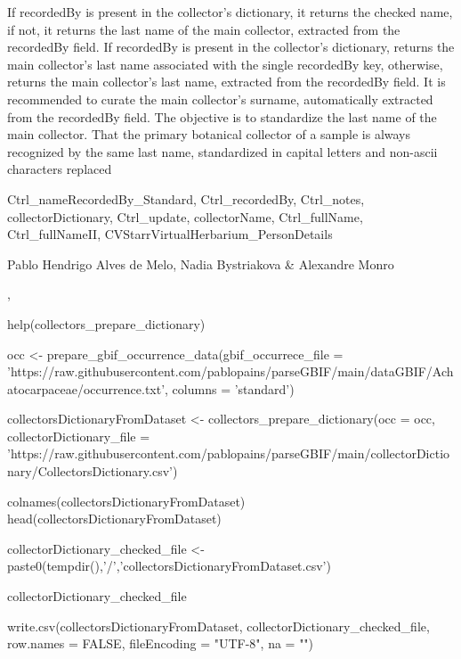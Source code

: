 \documentclass[a4paper]{book}
\begin{document}
%
\begin{Details}
If recordedBy is present in the collector's dictionary, it returns the checked name, if not, it returns the last name of the main collector, extracted from the recordedBy field.
If recordedBy is present in the collector's dictionary, returns the main collector's last name associated with the single recordedBy key,
otherwise, returns the main collector's last name, extracted from the recordedBy field.
It is recommended to curate the main collector's surname, automatically extracted from the recordedBy field.
The objective is to standardize the last name of the main collector.
That the primary botanical collector of a sample is always recognized by the same last name, standardized in capital letters and non-ascii characters replaced
\end{Details}
%
\begin{Value}
Ctrl\_nameRecordedBy\_Standard,
Ctrl\_recordedBy,
Ctrl\_notes,
collectorDictionary,
Ctrl\_update,
collectorName,
Ctrl\_fullName,
Ctrl\_fullNameII,
CVStarrVirtualHerbarium\_PersonDetails
\end{Value}
%
\begin{Author}
Pablo Hendrigo Alves de Melo,
Nadia Bystriakova \&
Alexandre Monro
\end{Author}
%
\begin{SeeAlso}
, 
\end{SeeAlso}
%
\begin{Examples}
\begin{ExampleCode}

help(collectors_prepare_dictionary)

occ <- prepare_gbif_occurrence_data(gbif_occurrece_file =  'https://raw.githubusercontent.com/pablopains/parseGBIF/main/dataGBIF/Achatocarpaceae/occurrence.txt',
                                    columns = 'standard')

collectorsDictionaryFromDataset <- collectors_prepare_dictionary(occ = occ,
                                                                collectorDictionary_file =  'https://raw.githubusercontent.com/pablopains/parseGBIF/main/collectorDictionary/CollectorsDictionary.csv')

colnames(collectorsDictionaryFromDataset)
head(collectorsDictionaryFromDataset)

collectorDictionary_checked_file <- paste0(tempdir(),'/','collectorsDictionaryFromDataset.csv')

collectorDictionary_checked_file

write.csv(collectorsDictionaryFromDataset,
          collectorDictionary_checked_file,
          row.names = FALSE,
          fileEncoding = "UTF-8",
          na = "")

\end{ExampleCode}
\end{Examples}
\end{document}
